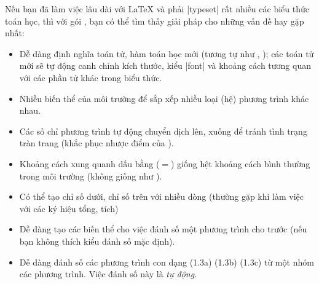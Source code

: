 \medskip
{}

\bigskip
Nếu bạn đã làm việc lâu dài với \LaTeX{} và phải |typeset| rất nhiều các biểu thức
toán học, thì với gói , bạn có thể tìm thấy giải pháp
cho những vấn đề hay gặp nhất:

\medskip
\begin{itemize}
\item
Dễ dàng định nghĩa toán tử, hàm toán học mới (tương tự như , );
các toán tử mới sẽ tự động canh chỉnh kích thước, kiểu |font|
và khoảng cách tương quan với các phần tử khác trong biểu thức.

\item
Nhiều biến thể của môi trường 
để sắp xếp nhiều loại (hệ) phương trình khác nhau.

\item
Các số chỉ phương trình tự động chuyển dịch lên, xuống để tránh
tình trạng tràn trang (khắc phục nhược điểm của ).

\item
Khoảng cách xung quanh dấu bằng ($=$) giống hệt khoảng cách bình thường
trong môi trường  (không giống như ).

\item
Có thể tạo chỉ số dưới, chỉ số trên với nhiều dòng (thường gặp khi 
làm việc với các ký hiệu tổng, tích)

\item
Dễ dàng tạo các biến thể cho việc đánh số một phương trình cho trước
(nếu bạn không thích kiểu đánh số mặc định).

\item
Dễ dàng đánh số các phương trình con dạng (1.3a) (1.3b) (1.3c)
từ một nhóm các phương trình. Việc đánh số này là \emph{tự động.}
\end{itemize}

